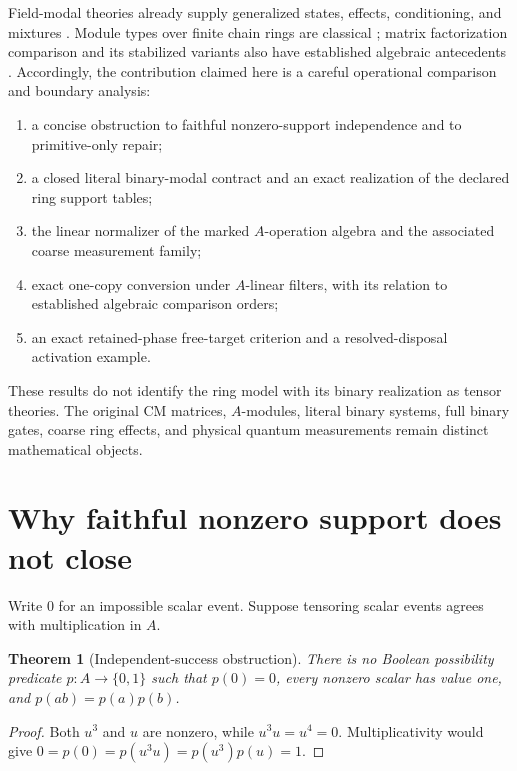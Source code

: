 \documentclass[11pt]{article}
\newtheorem{theorem}{Theorem}[section]
\theoremstyle{definition}
\theoremstyle{remark}
\begin{document}
Field-modal theories already supply generalized states, effects, conditioning, and mixtures \cite{SW10,SW12}. Module types over finite chain rings are classical \cite{BHKW}; matrix factorization comparison and its stabilized variants also have established algebraic antecedents \cite{APGPS,AntoineRing,HungLi}. Accordingly, the contribution claimed here is a careful operational comparison and boundary analysis:

\begin{enumerate}
  \item a concise obstruction to faithful nonzero-support independence and to primitive-only repair;
  \item a closed literal binary-modal contract and an exact realization of the declared ring support tables;
  \item the linear normalizer of the marked $A$-operation algebra and the associated coarse measurement family;
  \item exact one-copy conversion under $A$-linear filters, with its relation to established algebraic comparison orders;
  \item an exact retained-phase free-target criterion and a resolved-disposal activation example.
\end{enumerate}

These results do not identify the ring model with its binary realization as tensor theories. The original CM matrices, $A$-modules, literal binary systems, full binary gates, coarse ring effects, and physical quantum measurements remain distinct mathematical objects.

\section{Why faithful nonzero support does not close}

Write $0$ for an impossible scalar event. Suppose tensoring scalar events agrees with multiplication in $A$.

\begin{theorem}[Independent-success obstruction]\label{thm:obstruction}
There is no Boolean possibility predicate $p:A\to\{0,1\}$ such that $p(0)=0$, every nonzero scalar has value one, and $p(ab)=p(a)p(b)$.
\end{theorem}

\begin{proof}
Both $u^3$ and $u$ are nonzero, while $u^3u=u^4=0$. Multiplicativity would give
$0=p(0)=p(u^3u)=p(u^3)p(u)=1$.
\end{proof}
\end{document}
